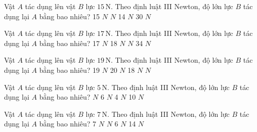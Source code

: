 \begin{ex}
Vật $A$ tác dụng lên vật $B$ lực $15\,\text{N}$. Theo định luật III Newton, độ lớn lực $B$ tác dụng lại $A$ bằng bao nhiêu?
\choice
{15 $N$}
{ $N$}
{14 $N$}
{30 $N$}
\end{ex}

\begin{ex}
Vật $A$ tác dụng lên vật $B$ lực $17\,\text{N}$. Theo định luật III Newton, độ lớn lực $B$ tác dụng lại $A$ bằng bao nhiêu?
\choice
{17 $N$}
{18 $N$}
{ $N$}
{34 $N$}
\end{ex}

\begin{ex}
Vật $A$ tác dụng lên vật $B$ lực $19\,\text{N}$. Theo định luật III Newton, độ lớn lực $B$ tác dụng lại $A$ bằng bao nhiêu?
\choice
{19 $N$}
{20 $N$}
{18 $N$}
{ $N$}
\end{ex}

\begin{ex}
Vật $A$ tác dụng lên vật $B$ lực $5\,\text{N}$. Theo định luật III Newton, độ lớn lực $B$ tác dụng lại $A$ bằng bao nhiêu?
\choice
{ $N$}
{6 $N$}
{4 $N$}
{10 $N$}
\end{ex}

\begin{ex}
Vật $A$ tác dụng lên vật $B$ lực $7\,\text{N}$. Theo định luật III Newton, độ lớn lực $B$ tác dụng lại $A$ bằng bao nhiêu?
\choice
{7 $N$}
{ $N$}
{6 $N$}
{14 $N$}
\end{ex}

